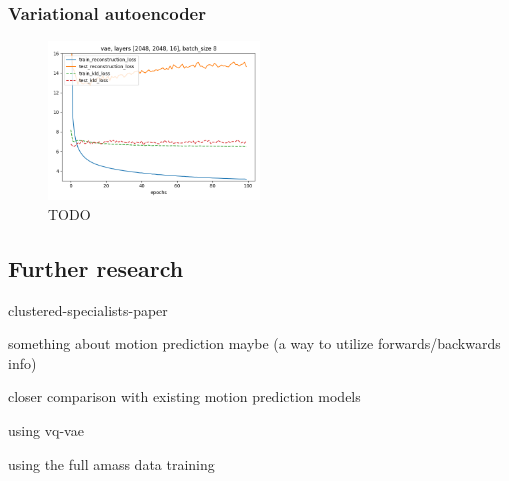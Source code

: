\subsubsection{Variational autoencoder}\label{subsubsec:vae}
\begin{figure}[h]
\centering
\includegraphics[width=0.5\textwidth]{img/vae_2048-2048-16_batch-8_losses}
\caption{TODO}
\label{fig:vae-loss}
\end{figure}


\subsection{Further research}\label{subsec:further-research}
clustered-specialists-paper~\cite{won2020scalable}

something about motion prediction maybe (a way to utilize forwards/backwards info)

closer comparison with existing motion prediction models

using vq-vae

using the full amass data training
